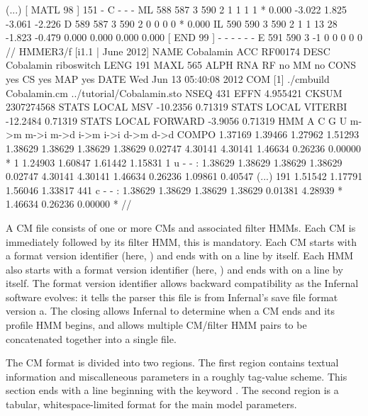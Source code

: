 \begin{tinysreoutput}
(...)
                                             [ MATL   98 ]    151      - C - - -
    ML   588   587 3   590     2     1     1     1     1       *   0.000                                 -3.022  1.825 -3.061 -2.226 
     D   589   587 3   590     2     0     0     0     0       *   0.000                                 
    IL   590   590 3   590     2     1     1    13    28  -1.823  -0.479                                  0.000  0.000  0.000  0.000 
                                             [ END    99 ]      -      - - - - -
     E   591   590 3    -1     0     0     0     0     0                                                 
//
HMMER3/f [i1.1 | June 2012]
NAME  Cobalamin
ACC   RF00174
DESC  Cobalamin riboswitch
LENG  191
MAXL  565
ALPH  RNA
RF    no
MM    no
CONS  yes
CS    yes
MAP   yes
DATE  Wed Jun 13 05:40:08 2012
COM   [1] ./cmbuild Cobalamin.cm ../tutorial/Cobalamin.sto
NSEQ  431
EFFN  4.955421
CKSUM 2307274568
STATS LOCAL MSV      -10.2356  0.71319
STATS LOCAL VITERBI  -12.2484  0.71319
STATS LOCAL FORWARD   -3.9056  0.71319
HMM          A        C        G        U   
            m->m     m->i     m->d     i->m     i->i     d->m     d->d
  COMPO   1.37169  1.39466  1.27962  1.51293
          1.38629  1.38629  1.38629  1.38629
          0.02747  4.30141  4.30141  1.46634  0.26236  0.00000        *
      1   1.24903  1.60847  1.61442  1.15831      1 u - - :
          1.38629  1.38629  1.38629  1.38629
          0.02747  4.30141  4.30141  1.46634  0.26236  1.09861  0.40547
(...)
    191   1.51542  1.17791  1.56046  1.33817    441 c - - :
          1.38629  1.38629  1.38629  1.38629
          0.01381  4.28939        *  1.46634  0.26236  0.00000        *
//
\end{tinysreoutput}

A CM file consists of one or more CMs and associated filter
HMMs. Each CM is immediately followed by its filter HMM, this is
mandatory. Each CM starts with a format version identifier (here,
) and ends with \prog{//} on a line by itself. Each
HMM also starts with a format version identifier (here,
) and ends with \prog{//} on a line by itself.  The
format version identifier allows backward compatibility as the
Infernal software evolves: it tells the parser this file is from
Infernal's save file format version a. The closing \prog{//} allows
Infernal to determine when a CM ends and its profile HMM begins, and
allows multiple CM/filter HMM pairs to be concatenated together into a
single file.

The CM format is divided into two regions. The first region contains
textual information and miscalleneous parameters in a roughly
tag-value scheme. This section ends with a line beginning with the
keyword . The second region is a tabular, whitespace-limited
format for the main model parameters.

